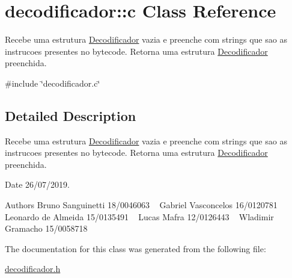 \hypertarget{classdecodificador_1_1c}{}\section{decodificador\+::c Class Reference}
\label{classdecodificador_1_1c}


Recebe uma estrutura \mbox{\hyperlink{structDecodificador}{Decodificador}} vazia e preenche com strings que sao as instrucoes presentes no bytecode. Retorna uma estrutura \mbox{\hyperlink{structDecodificador}{Decodificador}} preenchida.  




{\ttfamily \#include \char`\"{}decodificador.\+c\char`\"{}}



\subsection{Detailed Description}
Recebe uma estrutura \mbox{\hyperlink{structDecodificador}{Decodificador}} vazia e preenche com strings que sao as instrucoes presentes no bytecode. Retorna uma estrutura \mbox{\hyperlink{structDecodificador}{Decodificador}} preenchida. 

\begin{DoxyDate}{Date}
26/07/2019.
\end{DoxyDate}
\begin{DoxyAuthor}{Authors}
Bruno Sanguinetti 18/0046063 ~\newline
Gabriel Vasconcelos 16/0120781 ~\newline
Leonardo de Almeida 15/0135491 ~\newline
Lucas Mafra 12/0126443 ~\newline
Wladimir Gramacho 15/0058718 ~\newline

\end{DoxyAuthor}


The documentation for this class was generated from the following file\+:\begin{DoxyCompactItemize}
\item 
\mbox{\hyperlink{decodificador_8h}{decodificador.\+h}}\end{DoxyCompactItemize}
